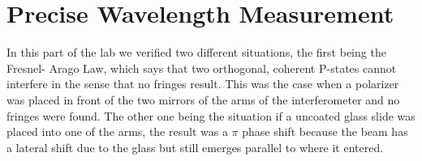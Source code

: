 \documentclass[paper=a4, fontsize=11pt]{scrartcl} %
\numberwithin{equation}{section} %
\numberwithin{figure}{section} %
\numberwithin{table}{section} %
\begin{document}
\section{Precise Wavelength Measurement}
In this part of the lab we verified two different situations, the first being the Fresnel- Arago Law, which says that two orthogonal, coherent P-states cannot interfere in the sense that no fringes result. This was the case when a polarizer was placed in front of the two mirrors of the arms of the interferometer and no fringes were found. The other one being the situation  if a uncoated glass slide was placed into  one of the arms, the result was a $\pi$ phase shift because the beam has a lateral shift due to the glass but still emerges parallel to where it entered. 
%
%

%
\end{document}

